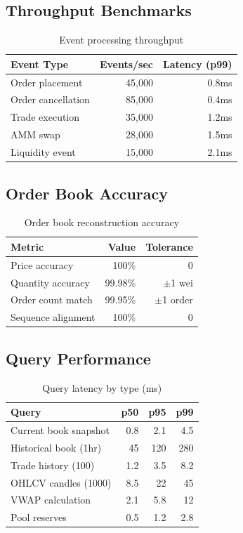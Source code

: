 \documentclass[11pt,twocolumn]{article}
\begin{document}
\subsection{Throughput Benchmarks}

\begin{table}[h]
\centering
\caption{Event processing throughput}
\begin{tabular}{@{}lrr@{}}
\toprule
Event Type & Events/sec & Latency (p99) \\
\midrule
Order placement & 45,000 & 0.8ms \\
Order cancellation & 85,000 & 0.4ms \\
Trade execution & 35,000 & 1.2ms \\
AMM swap & 28,000 & 1.5ms \\
Liquidity event & 15,000 & 2.1ms \\
\bottomrule
\end{tabular}
\label{tab:dex-throughput}
\end{table}

\subsection{Order Book Accuracy}

\begin{table}[h]
\centering
\caption{Order book reconstruction accuracy}
\begin{tabular}{@{}lrr@{}}
\toprule
Metric & Value & Tolerance \\
\midrule
Price accuracy & 100\% & 0 \\
Quantity accuracy & 99.98\% & $\pm$1 wei \\
Order count match & 99.95\% & $\pm$1 order \\
Sequence alignment & 100\% & 0 \\
\bottomrule
\end{tabular}
\label{tab:book-accuracy}
\end{table}

\subsection{Query Performance}

\begin{table}[h]
\centering
\caption{Query latency by type (ms)}
\begin{tabular}{@{}lrrr@{}}
\toprule
Query & p50 & p95 & p99 \\
\midrule
Current book snapshot & 0.8 & 2.1 & 4.5 \\
Historical book (1hr) & 45 & 120 & 280 \\
Trade history (100) & 1.2 & 3.5 & 8.2 \\
OHLCV candles (1000) & 8.5 & 22 & 45 \\
VWAP calculation & 2.1 & 5.8 & 12 \\
Pool reserves & 0.5 & 1.2 & 2.8 \\
\bottomrule
\end{tabular}
\label{tab:query-latency}
\end{table}
\end{document}

